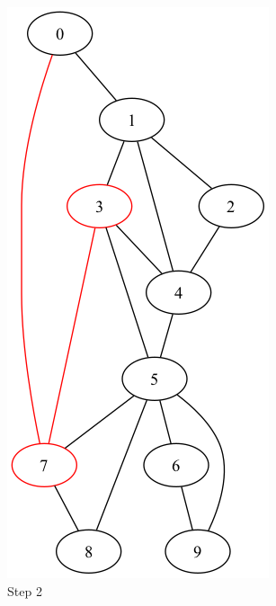 \documentclass[a4paper,11pt]{report}
\begin{document}
\begin{figure}[htbp]
\begin{subfigure}[b]{0.3\textwidth}
        \includegraphics[height=0.29\textheight]{notebook/assets/aufgabe_07_fleury_step_1.png}
        \caption{Step 2}
        \label{fig:fleury_step_2}
    \end{subfigure}
    \hfill
    \begin{subfigure}[b]{0.3\textwidth}

\end{subfigure}
\end{figure}
\end{document}
